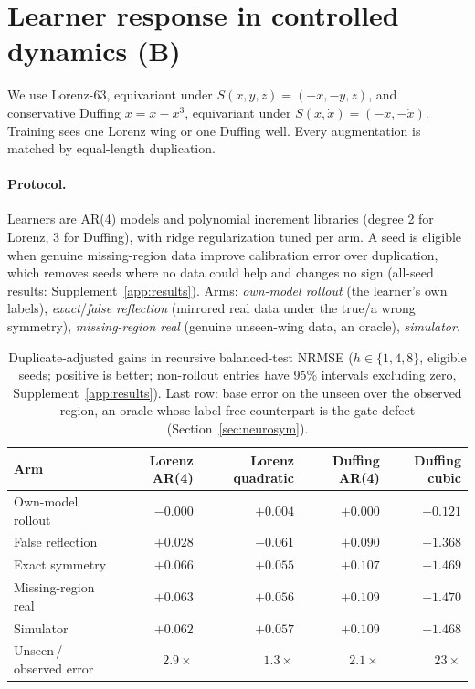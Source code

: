 \documentclass{l4dc2027}
\begin{document}
\section{Learner response in controlled dynamics (B)}\label{sec:experiments}
We use Lorenz-63, equivariant under $S(x,y,z)=(-x,-y,z)$, and conservative Duffing $\ddot x=x-x^3$, equivariant under $S(x,\dot x)=(-x,-\dot x)$. Training sees one Lorenz wing or one Duffing well. Every augmentation is matched by equal-length duplication.

\paragraph{Protocol.} Learners are AR(4) models and polynomial increment libraries (degree 2 for Lorenz, 3 for Duffing), with ridge regularization tuned per arm. A seed is eligible when genuine missing-region data improve calibration error over duplication, which removes seeds where no data could help and changes no sign (all-seed results: Supplement~\ref{app:results}). Arms: \emph{own-model rollout} (the learner's own labels), \emph{exact}/\emph{false reflection} (mirrored real data under the true/a wrong symmetry), \emph{missing-region real} (genuine unseen-wing data, an oracle), \emph{simulator}.

\begin{table}[t]
\centering\small
\caption{Duplicate-adjusted gains in recursive balanced-test NRMSE ($h\in\{1,4,8\}$, eligible seeds; positive is better; non-rollout entries have 95\% intervals excluding zero, Supplement~\ref{app:results}). Last row: base error on the unseen over the observed region, an oracle whose label-free counterpart is the gate defect (Section~\ref{sec:neurosym}).}
\label{tab:keyarms}
\setlength{\tabcolsep}{4.2pt}
\begin{tabular}{lrrrr}
\toprule
Arm & Lorenz AR(4) & Lorenz quadratic & Duffing AR(4) & Duffing cubic\\
\midrule
Own-model rollout & $-0.000$ & $+0.004$ & $+0.000$ & $+0.121$\\
False reflection & $+0.028$ & $\mathbf{-0.061}$ & $+0.090$ & $+1.368$\\
Exact symmetry & $+0.066$ & $+0.055$ & $+0.107$ & $+1.469$\\
Missing-region real & $+0.063$ & $+0.056$ & $+0.109$ & $+1.470$\\
Simulator & $+0.062$ & $+0.057$ & $+0.109$ & $+1.468$\\
\midrule
Unseen\,/\,observed error & $2.9\times$ & $1.3\times$ & $2.1\times$ & $23\times$\\
\bottomrule
\end{tabular}
\end{table}
\end{document}
